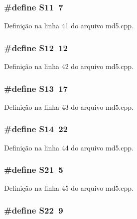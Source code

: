 \subsubsection[{S11}]{\setlength{\rightskip}{0pt plus 5cm}\#define S11~7}\label{md5_8cpp_a51398c0e5541164ad4d6615880073305}


Definição na linha 41 do arquivo md5.\+cpp.

\subsubsection[{S12}]{\setlength{\rightskip}{0pt plus 5cm}\#define S12~12}\label{md5_8cpp_a1ec499cd0e54ecc28c2ac2afea5b038e}


Definição na linha 42 do arquivo md5.\+cpp.

\subsubsection[{S13}]{\setlength{\rightskip}{0pt plus 5cm}\#define S13~17}\label{md5_8cpp_aaeec90429105fb54d853dd4fc7027a54}


Definição na linha 43 do arquivo md5.\+cpp.

\subsubsection[{S14}]{\setlength{\rightskip}{0pt plus 5cm}\#define S14~22}\label{md5_8cpp_a78342b0ccde2ed12fdf19a113cc266cf}


Definição na linha 44 do arquivo md5.\+cpp.

\subsubsection[{S21}]{\setlength{\rightskip}{0pt plus 5cm}\#define S21~5}\label{md5_8cpp_ab6d5354f647a0e7592a1f051fc8377b2}


Definição na linha 45 do arquivo md5.\+cpp.

\subsubsection[{S22}]{\setlength{\rightskip}{0pt plus 5cm}\#define S22~9}\label{md5_8cpp_addad30455da936bc1879ee9c72b46d59}


